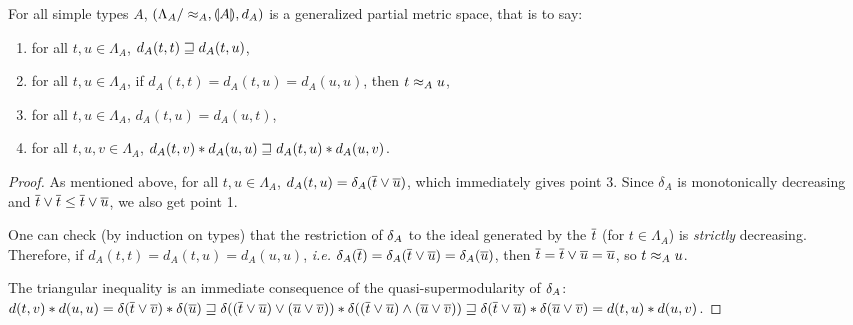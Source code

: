 \begin{corollary} \label{corollary:stlc-metric} For all simple types $A$, $\left(\Lambda_A/\approx_A, \llparenthesis A \rrparenthesis, d_A\right)$ is a generalized partial metric space, that is to say:
\begin{enumerate}
\item for all $t,u \in \Lambda_A$, $d_A(t,t) \sqsupseteq d_A(t,u)$,
\item for all $t,u \in \Lambda_A$, if $d_A(t,t) = d_A(t,u) = d_A(u,u)$, then $t \approx_A u$,
\item for all $t,u \in \Lambda_A$, $d_A(t,u) = d_A(u,t)$,
\item for all $t,u,v \in \Lambda_A$, $d_A(t,v) \mathbin{\ast} d_A(u,u) \sqsupseteq d_A(t,u) \mathbin{\ast} d_A(u,v)$.
\end{enumerate}
\end{corollary}
\begin{proof}
As mentioned above, for all $t,u\in\Lambda_A$, $d_A(t,u) = \delta_A(\overline{t} \vee \overline{u})$, which immediately gives point 3. Since $\delta_A$ is monotonically decreasing and $\overline{t} \vee \overline{t} \leq \overline{t} \vee \overline{u}$, we also get point 1.

One can check (by induction on types) that the restriction of $\delta_A$ to the ideal generated by the $\overline{t}$ (for $t \in \Lambda_A$) is \emph{strictly} decreasing. Therefore, if  $d_A(t,t) = d_A(t,u) = d_A(u,u)$, \textit{i.e.} $\delta_A(\overline{t}) = \delta_A(\overline{t} \vee \overline{u}) = \delta_A(\overline{u})$,  then $\overline{t} = \overline{t} \vee \overline{u} = \overline{u}$, so $t \approx_A u$.

The triangular inequality is an immediate consequence of the quasi-supermodularity of $\delta_A$: $d(t,v) \mathbin{\ast} d(u,u) = \delta(\overline{t} \vee \overline{v}) \mathbin{\ast} \delta(\overline{u}) \sqsupseteq \delta((\overline{t} \vee \overline{u}) \vee (\overline{u} \vee \overline{v})) \mathbin{\ast} \delta((\overline{t} \vee \overline{u}) \wedge (\overline{u} \vee \overline{v})) \sqsupseteq \delta(\overline{t} \vee  \overline{u}) \mathbin{\ast} \delta(\overline{u} \vee  \overline{v}) = d(t,u) \mathbin{\ast} d(u,v)$.
\end{proof}

